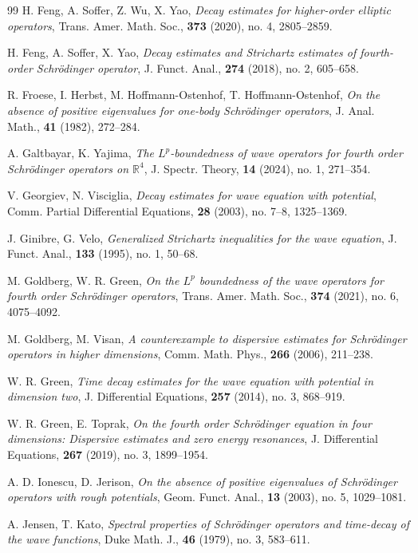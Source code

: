 \documentclass[reqno]{amsart}
\newcommand\R{\mathbb{R}}
\numberwithin{equation}{section}
\begin{document}
\begin{thebibliography}{99}
H. Feng, A. Soffer, Z. Wu, X. Yao, \emph{Decay estimates for higher-order
elliptic operators}, Trans. Amer. Math. Soc., \textbf{373} (2020), no. 4, 2805--2859.

H. Feng, A. Soffer, X. Yao, \emph{Decay estimates and
 Strichartz estimates of fourth-order Schr\"{o}dinger operator}, J. Funct. Anal., \textbf{274} (2018), no. 2, 605--658.

R. Froese, I. Herbst, M. Hoffmann-Ostenhof,
T. Hoffmann-Ostenhof, \emph{On the absence of positive eigenvalues for one-body
  Schr\"{o}dinger operators}, J. Anal. Math., \textbf{41} (1982), 272--284.

  A. Galtbayar, K. Yajima, \emph{The $L^p$-boundedness of wave operators for fourth order Schr\"odinger operators
  	on $\R^4$}, J. Spectr. Theory, \textbf{14} (2024), no. 1, 271--354.

V. Georgiev, N. Visciglia, \emph{Decay estimates for wave equation with potential},
 Comm. Partial Differential Equations, \textbf{28} (2003), no. 7--8, 1325--1369.

J. Ginibre, G. Velo, \emph{Generalized Strichartz inequalities for the wave equation},
J. Funct. Anal., \textbf{133} (1995), no. 1, 50--68.

M. Goldberg,  W. R. Green, \emph{On the $L^p$ boundedness of the wave operators for fourth
order Schr\"{o}dinger operators}, Trans. Amer. Math. Soc., \textbf{374} (2021), no. 6, 4075--4092.

M. Goldberg, M. Visan, \emph{A counterexample to dispersive estimates for Schr\"{o}dinger operators in higher
 dimensions}, Comm. Math. Phys., \textbf{266} (2006), 211--238.

W. R. Green, \emph{Time decay estimates for the wave equation with potential in dimension two},
 J. Differential Equations, \textbf{257} (2014), no. 3, 868--919.

W. R. Green, E. Toprak, \emph{On the fourth order Schr\"{o}dinger equation in four dimensions: Dispersive estimates and zero energy resonances},
J. Differential Equations, \textbf{267} (2019), no. 3, 1899--1954.

A. D. Ionescu, D. Jerison, \emph{On the absence of positive eigenvalues of
  {S}chr\"{o}dinger operators with rough potentials}, Geom. Funct. Anal.,
  \textbf{13} (2003), no. 5, 1029--1081.

A. Jensen, T. Kato, \emph{Spectral properties of Schr\"{o}dinger
  operators and time-decay of the wave functions}, Duke Math. J., \textbf{46} (1979), no. 3, 583--611.


\end{thebibliography}
\end{document}
